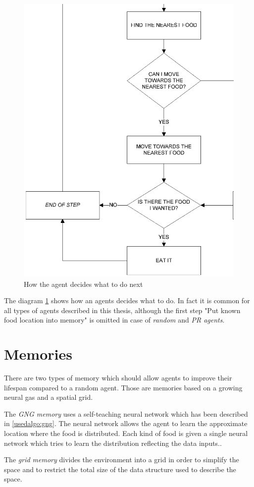 \begin{figure}
  \centering                                
  \includegraphics[scale=0.7]{diagrams/solution/decision-flowchart.eps}    
  \caption{How the agent decides what to do next}
  \label{solution:decision}
\end{figure}

The diagram \ref{solution:decision} shows how an agents decides what to do. In fact it is common for all types of agents described in this thesis, although the first step "Put known food location into memory" is omitted in case of \emph{random} and \emph{PR agents}.

\section{Memories}

There are two types of memory which should allow agents to improve their lifespan compared to a random agent. Those are memories based on a growing neural gas and a spatial grid.     

The \emph{GNG memory} uses a self-teaching neural network which has been described in \ref{usedalgo:gng}. The neural network allows the agent to learn the approximate location where the food is distributed. Each kind of food is given a single neural network which tries to learn the distribution reflecting the data inputs..

The \emph{grid memory} divides the environment into a grid in order to simplify the space and to restrict the total size of the data structure used to describe the space.




